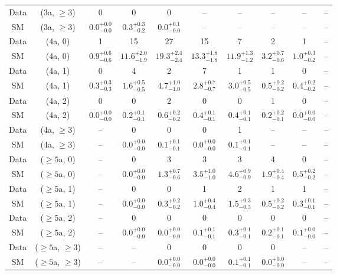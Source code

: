 \begin{table}[h!]
{\begin{tabular}{cccccccccc}
	Data & (3a, $\ge3$) & 0 & 0 & 0 & -- & -- & -- & -- & -- \\[0.5ex] 
	SM & (3a, $\ge3$) & $0.0^{+ 0.0 }_{- 0.0 }$ & $0.3^{+ 0.3 }_{- 0.2 }$ & $0.0^{+ 0.1 }_{- 0.0 }$ & -- & -- & -- & -- & -- \\[0.5ex] 
	Data & (4a, 0) & 1 & 15 & 27 & 15 & 7 & 2 & 1 & -- \\[0.5ex] 
	SM & (4a, 0) & $0.9^{+ 0.6 }_{- 0.6 }$ & $11.6^{+ 2.0 }_{- 1.9 }$ & $19.3^{+ 2.4 }_{- 2.4 }$ & $13.3^{+ 1.8 }_{- 1.8 }$ & $11.9^{+ 1.3 }_{- 1.2 }$ & $3.2^{+ 0.7 }_{- 0.6 }$ & $1.0^{+ 0.3 }_{- 0.2 }$ & -- \\[0.5ex] 
	Data & (4a, 1) & 0 & 4 & 2 & 7 & 1 & 1 & 0 & -- \\[0.5ex] 
	SM & (4a, 1) & $0.3^{+ 0.3 }_{- 0.3 }$ & $1.6^{+ 0.5 }_{- 0.5 }$ & $4.7^{+ 1.0 }_{- 1.0 }$ & $2.8^{+ 0.7 }_{- 0.7 }$ & $3.0^{+ 0.5 }_{- 0.5 }$ & $0.5^{+ 0.2 }_{- 0.2 }$ & $0.4^{+ 0.2 }_{- 0.2 }$ & -- \\[0.5ex] 
	Data & (4a, 2) & 0 & 0 & 2 & 0 & 0 & 1 & 0 & -- \\[0.5ex] 
	SM & (4a, 2) & $0.0^{+ 0.0 }_{- 0.0 }$ & $0.2^{+ 0.1 }_{- 0.1 }$ & $0.6^{+ 0.2 }_{- 0.2 }$ & $0.4^{+ 0.1 }_{- 0.1 }$ & $0.4^{+ 0.1 }_{- 0.1 }$ & $0.2^{+ 0.2 }_{- 0.1 }$ & $0.0^{+ 0.0 }_{- 0.0 }$ & -- \\[0.5ex] 
	Data & (4a, $\ge3$) & -- & 0 & 0 & 0 & 1 & -- & -- & -- \\[0.5ex] 
	SM & (4a, $\ge3$) & -- & $0.0^{+ 0.0 }_{- 0.0 }$ & $0.1^{+ 0.1 }_{- 0.1 }$ & $0.0^{+ 0.0 }_{- 0.0 }$ & $0.1^{+ 0.1 }_{- 0.1 }$ & -- & -- & -- \\[0.5ex] 
	Data & ($\ge5$a, 0) & -- & 0 & 3 & 3 & 3 & 4 & 0 & -- \\[0.5ex] 
	SM & ($\ge5$a, 0) & -- & $0.0^{+ 0.0 }_{- 0.0 }$ & $1.3^{+ 0.7 }_{- 0.6 }$ & $3.5^{+ 1.0 }_{- 1.0 }$ & $4.6^{+ 0.9 }_{- 0.9 }$ & $1.9^{+ 0.4 }_{- 0.4 }$ & $0.5^{+ 0.2 }_{- 0.2 }$ & -- \\[0.5ex] 
	Data & ($\ge5$a, 1) & -- & 0 & 0 & 1 & 2 & 1 & 1 & -- \\[0.5ex] 
	SM & ($\ge5$a, 1) & -- & $0.0^{+ 0.0 }_{- 0.0 }$ & $0.3^{+ 0.2 }_{- 0.2 }$ & $1.0^{+ 0.4 }_{- 0.4 }$ & $1.5^{+ 0.3 }_{- 0.3 }$ & $0.5^{+ 0.2 }_{- 0.2 }$ & $0.3^{+ 0.1 }_{- 0.1 }$ & -- \\[0.5ex] 
	Data & ($\ge5$a, 2) & -- & 0 & 0 & 0 & 0 & 0 & 0 & -- \\[0.5ex] 
	SM & ($\ge5$a, 2) & -- & $0.0^{+ 0.0 }_{- 0.0 }$ & $0.0^{+ 0.0 }_{- 0.0 }$ & $0.1^{+ 0.1 }_{- 0.1 }$ & $0.3^{+ 0.1 }_{- 0.1 }$ & $0.2^{+ 0.1 }_{- 0.1 }$ & $0.1^{+ 0.0 }_{- 0.0 }$ & -- \\[0.5ex] 
	Data & ($\ge5$a, $\ge3$) & -- & -- & 0 & 0 & 0 & 0 & -- & -- \\[0.5ex] 
	SM & ($\ge5$a, $\ge3$) & -- & -- & $0.0^{+ 0.0 }_{- 0.0 }$ & $0.0^{+ 0.0 }_{- 0.0 }$ & $0.1^{+ 0.1 }_{- 0.1 }$ & $0.0^{+ 0.0 }_{- 0.0 }$ & -- & -- \\[0.5ex] 
	\hline
	\hline
\end{tabular}}
\end{table}
